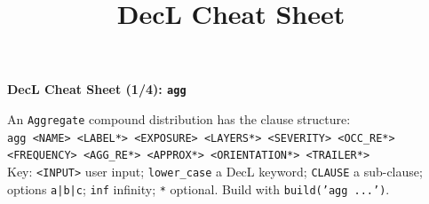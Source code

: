 %
%
%


\title{DecL Cheat Sheet}






{\huge{\bf DecL Cheat Sheet \textnormal{(1/4)}: \texttt{agg}}}

\raggedright An \texttt{Aggregate} compound distribution has the clause structure: \\
\texttt{agg <NAME> <LABEL*> <EXPOSURE> <LAYERS*> <SEVERITY> <OCC\_RE*> <FREQUENCY> <AGG\_RE*> <APPROX*> <ORIENTATION*> <TRAILER*>} \\
Key: \texttt{<INPUT>} user input; \texttt{lower\_case} a DecL keyword; \texttt{CLAUSE} a sub-clause; options \texttt{a|b|c}; \texttt{inf} infinity; \texttt{*} optional. Build with \texttt{build('agg ...')}.

